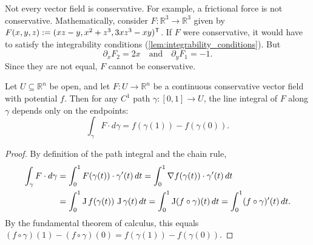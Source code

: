 \begin{example}
\label{ex:non_conservative_field}
Not every vector field is conservative. For example, a frictional force is not conservative. Mathematically, consider $F : \mathbb{R}^3 \to \mathbb{R}^3$ given by $F(x,y,z) := (xz-y, x^2+z^3, 3xz^3 - xy)^{\mathsf{T}}$. If $F$ were conservative, it would have to satisfy the integrability conditions (\cref{lem:integrability_conditions}). But
\[\partial_x F_2 = 2x \quad \text{and} \quad \partial_y F_1 = -1.\]
Since they are not equal, $F$ cannot be conservative.
\end{example}

\begin{proposition}
\label{prop:work_difference_potential}
Let $U \subseteq \mathbb{R}^n$ be open, and let $F : U \to \mathbb{R}^n$ be a continuous conservative vector field with potential $f$. Then for any $C^1$ path $\gamma : [0,1] \to U$, the line integral of $F$ along $\gamma$ depends only on the endpoints:
\[\int_\gamma F \cdot d\gamma = f(\gamma(1)) - f(\gamma(0)).\]
\end{proposition}
\begin{proof}
By definition of the path integral and the chain rule,
\begin{align*}
\int_\gamma F \cdot d\gamma &= \int_0^1 F(\gamma(t)) \cdot \gamma'(t) \,dt = \int_0^1 \nabla f(\gamma(t)) \cdot \gamma'(t) \,dt \\
&= \int_0^1 \operatorname{J} f(\gamma(t))\, \operatorname{J} \gamma(t) \,dt = \int_0^1 \operatorname{J}(f \circ \gamma)(t) \,dt = \int_0^1 (f \circ \gamma)'(t) \,dt.
\end{align*}
By the fundamental theorem of calculus, this equals $(f \circ \gamma)(1) - (f \circ \gamma)(0) = f(\gamma(1)) - f(\gamma(0))$.
\end{proof}


